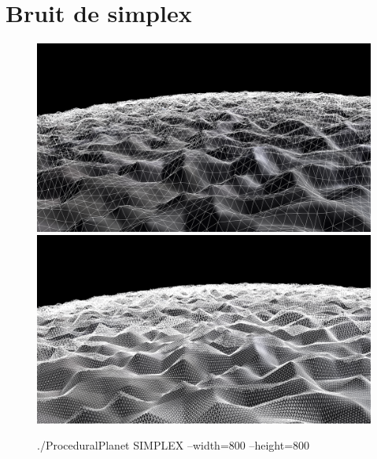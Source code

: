 \section*{Bruit de simplex}

\begin{center}

\begin{figure}
    \centering
    \includegraphics[width=13cm]{img/SIMPLEX_w800_h800_wire_0.png}
    \includegraphics[width=13cm]{img/SIMPLEX_w800_h800_wire_1.png}
    \caption{./ProceduralPlanet SIMPLEX --width=800 --height=800}
    \label{fig:simplex_800}
\end{figure}



\end{center}
